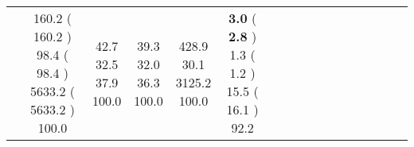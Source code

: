\documentclass[9pt]{article}
\begin{document}
\begin{landscape}
\begin{longtable}{ l | c c c c | c c c c | c c c c | c c c c |}
 &
                    
                            \makecell{              160.2
     (             160.2
    ) \\
            {\footnotesize             98.4
     (              98.4
     )} \\
            {\footnotesize             5633.2
     (            5633.2
    ) } \\
            {\small  \textcolor[rgb]{ 0.2 , 0.7 , 0.1} {100.0  }
} }


             &
                            \makecell{              42.7
     \\
            {\footnotesize             32.5
    } \\  {\footnotesize             37.9
     } \\
            {\small \textcolor[rgb]{ 0.2 , 0.7 , 0.1} {100.0  }
} }
             &                         \makecell{              39.3
     \\
            {\footnotesize             32.0
    } \\  {\footnotesize             36.3
     } \\
            {\small \textcolor[rgb]{ 0.2 , 0.7 , 0.1} {100.0  }
} }
             &
                            \makecell{              428.9
     \\
            {\footnotesize             30.1
    } \\  {\footnotesize             3125.2
     } \\
            {\small \textcolor[rgb]{ 0.2 , 0.7 , 0.1} {100.0  }
} }
            

 & 
                            \makecell{              \textbf{ 3.0 }
     (             \textbf{ 2.8 }
    ) \\
            {\footnotesize             1.3
     (              1.2
     )} \\
            {\footnotesize             15.5
     (            16.1
    ) } \\
            {\small  \textcolor[rgb]{ 0.356 , 0.545 , 0.1} {92.2  }
} }



\end{longtable}
\end{landscape}
\end{document}
